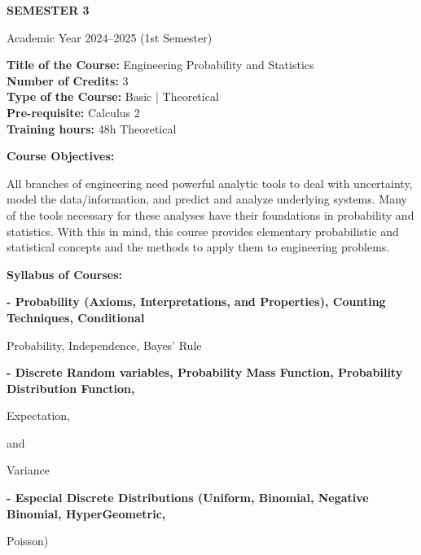 \documentclass[12pt,a4paper]{article}
\begin{document}
\newpage
\vspace*{\fill}
\begin{center}
  {\fontsize{28pt}{34pt}\selectfont \textbf{SEMESTER 3}}\par\vspace{12pt}
  {\fontsize{13pt}{17pt}\selectfont Academic Year 2024–2025 (1st Semester)}
\end{center}
\vspace*{\fill}

\newpage
\textbf{Title of the Course:} Engineering Probability and Statistics\\
\textbf{Number of Credits:} 3\\
\textbf{Type of the Course:} Basic | Theoretical\\
\textbf{Pre-requisite:} Calculus 2\\
\textbf{Training hours:} 48h Theoretical\par\vspace{4pt}
\textbf{Course Objectives:}\par\vspace{2pt}
All branches of engineering need powerful analytic tools to deal with uncertainty, model the
data/information, and predict and analyze underlying systems. Many of the tools necessary for
these analyses have their foundations in probability and statistics. With this in mind, this course
provides elementary probabilistic and statistical concepts and the methods to apply them to
engineering problems.\par\vspace{4pt}
\textbf{Syllabus of Courses:}\par\vspace{2pt}
\vspace{2pt}\textbf{- Probability (Axioms, Interpretations, and Properties), Counting Techniques, Conditional}\par
Probability, Independence, Bayes’ Rule\par
\vspace{2pt}\textbf{- Discrete Random variables, Probability Mass Function, Probability Distribution Function,}\par
Expectation,\par
and\par
Variance\par
\vspace{2pt}\textbf{- Especial Discrete Distributions (Uniform, Binomial, Negative Binomial, HyperGeometric,}\par
Poisson)\par
\end{document}
